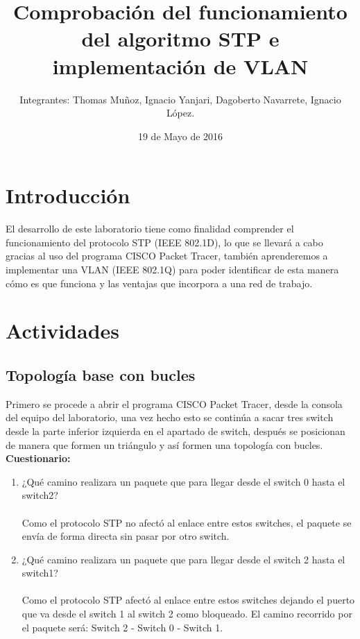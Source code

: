 \documentclass{udpreport}
\title{Comprobación del funcionamiento del algoritmo STP e implementación de VLAN}
\author{Integrantes: Thomas Muñoz, Ignacio Yanjari, Dagoberto Navarrete, Ignacio López.}
\date{19 de Mayo de 2016}
\begin{document}
\maketitle
\tableofcontents
\listoffigures
\chapter{Introducción}
  El desarrollo de este laboratorio tiene como finalidad comprender el funcionamiento del protocolo STP (IEEE 802.1D), lo que se
  llevará a cabo gracias al uso del programa CISCO Packet Tracer, también aprenderemos a implementar una VLAN (IEEE 802.1Q) para poder
  identificar de esta manera cómo es que funciona y las ventajas que incorpora a una red de trabajo.
\chapter{Actividades}
	\section{Topología base con bucles}
	Primero se procede a abrir el programa CISCO Packet Tracer, desde la consola del equipo del laboratorio, una vez hecho esto se
	continúa a sacar tres switch desde la parte inferior izquierda en el apartado de switch, después se posicionan de manera que
	formen un triángulo y así formen una topología con bucles.\\
	{\large \bf{Cuestionario: }}\\
	\begin{enumerate}
	    \item ¿Qué camino realizara un paquete que para llegar desde el switch
0 hasta el switch2?\\\\
    Como el protocolo STP no afectó al enlace entre estos switches, el paquete se envía de forma directa sin pasar por otro switch.
    
        \item ¿Qué camino realizara un paquete que para llegar desde el switch
2 hasta el switch1?\\\\
    Como el protocolo STP afectó al enlace entre estos switches dejando el puerto que va desde el switch 1 al switch 2 como bloqueado. El camino recorrido por el paquete será: Switch 2 - Switch 0 - Switch 1. 
	\end{enumerate}
\end{document}

